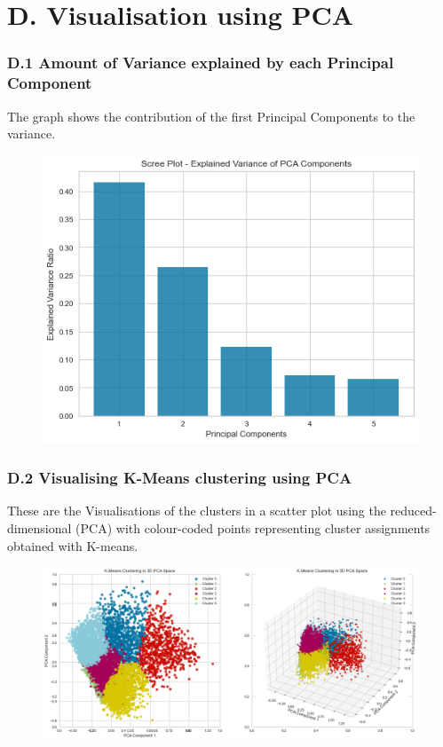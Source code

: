 \documentclass{article}
\begin{document}
\section*{D. Visualisation using PCA}
\subsubsection*{D.1 Amount of Variance explained by each Principal Component}
The graph shows the contribution of the first Principal Components to the variance.
\label{app:expVariance}
\begin{figure}[H]
    \centering
    \includegraphics[width=1\linewidth]{Images/scree.png}
\end{figure}
 

\subsubsection*{D.2 Visualising K-Means clustering using PCA}
These are the Visualisations of the clusters in a scatter plot using the reduced-dimensional (PCA) with colour-coded points representing cluster assignments obtained with K-means.
\label{app:kmeans_pca}
\begin{figure}[H]
    \centering
    \includegraphics[width=1\linewidth]{Images/PCA K MEANS.png}
\end{figure}
\end{document}
